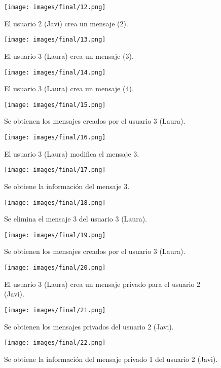 \documentclass[12pt,a4paper, spanish]{article}
\begin{document}
\begin{figure}[H]
	\centering
	\texttt{[image: images/final/12.png]}
	\caption{El usuario 2 (Javi) crea un mensaje (2).}
\end{figure}
\begin{figure}[H]
	\centering
	\texttt{[image: images/final/13.png]}
	\caption{El usuario 3 (Laura) crea un mensaje (3).}
\end{figure}
\begin{figure}[H]
	\centering
	\texttt{[image: images/final/14.png]}
	\caption{El usuario 3 (Laura) crea un mensaje (4).}
\end{figure}
\begin{figure}[H]
	\centering
	\texttt{[image: images/final/15.png]}
	\caption{Se obtienen los mensajes creados por el usuario 3 (Laura).}
\end{figure}
\begin{figure}[H]
	\centering
	\texttt{[image: images/final/16.png]}
	\caption{El usuario 3 (Laura) modifica el mensaje 3.}
\end{figure}
\begin{figure}[H]
	\centering
	\texttt{[image: images/final/17.png]}
	\caption{Se obtiene la información del mensaje 3.}
\end{figure}
\begin{figure}[H]
	\centering
	\texttt{[image: images/final/18.png]}
	\caption{Se elimina el mensaje 3 del usuario 3 (Laura).}
\end{figure}
\begin{figure}[H]
	\centering
	\texttt{[image: images/final/19.png]}
	\caption{Se obtienen los mensajes creados por el usuario 3 (Laura).}
\end{figure}
\begin{figure}[H]
	\centering
	\texttt{[image: images/final/20.png]}
	\caption{El usuario 3 (Laura) crea un mensaje privado para el usuario 2 (Javi).}
\end{figure}
\begin{figure}[H]
	\centering
	\texttt{[image: images/final/21.png]}
	\caption{Se obtienen los mensajes privados del usuario 2 (Javi).}
\end{figure}
\begin{figure}[H]
	\centering
	\texttt{[image: images/final/22.png]}
	\caption{Se obtiene la información del mensaje privado 1 del usuario 2 (Javi).}
\end{figure}
\end{document}
